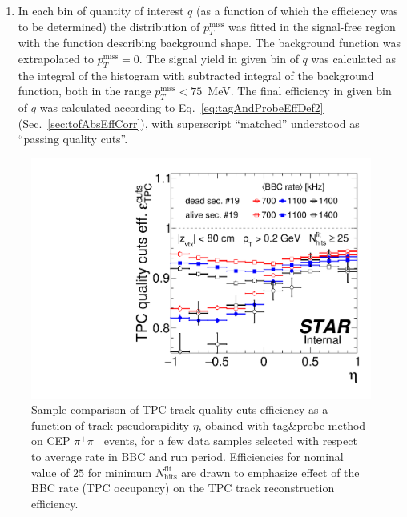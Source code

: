 \begin{enumerate}
 \item In each bin of quantity of interest $q$ (as a function of which the efficiency was to be determined) the distribution of $p_{T}^{\text{miss}}$ was fitted in the signal-free region with the function describing background shape. The background function was extrapolated to $p_{T}^{\text{miss}}=0$. The signal yield in given bin of $q$ was calculated as the integral of the histogram with subtracted integral of the background function, both in the range $p_{T}^{\text{miss}}<75$~MeV. The final efficiency in given bin of $q$ was calculated according to Eq.~\eqref{eq:tagAndProbeEffDef2} (Sec.~\ref{sec:tofAbsEffCorr}), with superscript ``matched'' understood as ``passing quality cuts''.
\end{enumerate}

\begin{figure}[H]\vspace{-12pt}%
\centering%
\begin{minipage}{.4725\textwidth}%
  \centering%
  \includegraphics[width=\linewidth,page=1]{graphics/systematicsEfficiency/bbc_and/TpcEffTagAndProbe.pdf}\vspace{-5pt}%
  \caption[Sample comparison of TPC track quality cuts efficiency from tag\&probe method.]%
  {Sample comparison of TPC track quality cuts efficiency as a function of track pseudorapidity $\eta$, obained with tag\&probe method on CEP $\pi^{+}\pi^{-}$ events, for a few data samples selected with respect to average rate in BBC and run period. Efficiencies for nominal value of $25$ for minimum $N_{\text{hits}}^{\text{fit}}$ are drawn to emphasize effect of the BBC rate (TPC occupancy) on the TPC track reconstruction efficiency.}\label{fig:TpcEffTagAndProbe}%

\end{minipage}
\end{figure}
